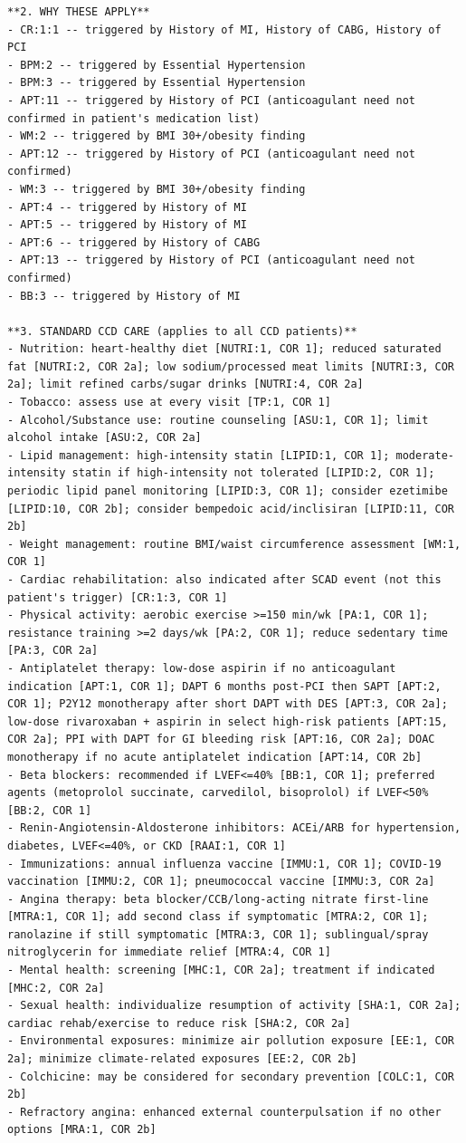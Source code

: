 \begin{lstlisting}
**2. WHY THESE APPLY**
- CR:1:1 -- triggered by History of MI, History of CABG, History of PCI
- BPM:2 -- triggered by Essential Hypertension
- BPM:3 -- triggered by Essential Hypertension
- APT:11 -- triggered by History of PCI (anticoagulant need not confirmed in patient's medication list)
- WM:2 -- triggered by BMI 30+/obesity finding
- APT:12 -- triggered by History of PCI (anticoagulant need not confirmed)
- WM:3 -- triggered by BMI 30+/obesity finding
- APT:4 -- triggered by History of MI
- APT:5 -- triggered by History of MI
- APT:6 -- triggered by History of CABG
- APT:13 -- triggered by History of PCI (anticoagulant need not confirmed)
- BB:3 -- triggered by History of MI

**3. STANDARD CCD CARE (applies to all CCD patients)**
- Nutrition: heart-healthy diet [NUTRI:1, COR 1]; reduced saturated fat [NUTRI:2, COR 2a]; low sodium/processed meat limits [NUTRI:3, COR 2a]; limit refined carbs/sugar drinks [NUTRI:4, COR 2a]
- Tobacco: assess use at every visit [TP:1, COR 1]
- Alcohol/Substance use: routine counseling [ASU:1, COR 1]; limit alcohol intake [ASU:2, COR 2a]
- Lipid management: high-intensity statin [LIPID:1, COR 1]; moderate-intensity statin if high-intensity not tolerated [LIPID:2, COR 1]; periodic lipid panel monitoring [LIPID:3, COR 1]; consider ezetimibe [LIPID:10, COR 2b]; consider bempedoic acid/inclisiran [LIPID:11, COR 2b]
- Weight management: routine BMI/waist circumference assessment [WM:1, COR 1]
- Cardiac rehabilitation: also indicated after SCAD event (not this patient's trigger) [CR:1:3, COR 1]
- Physical activity: aerobic exercise >=150 min/wk [PA:1, COR 1]; resistance training >=2 days/wk [PA:2, COR 1]; reduce sedentary time [PA:3, COR 2a]
- Antiplatelet therapy: low-dose aspirin if no anticoagulant indication [APT:1, COR 1]; DAPT 6 months post-PCI then SAPT [APT:2, COR 1]; P2Y12 monotherapy after short DAPT with DES [APT:3, COR 2a]; low-dose rivaroxaban + aspirin in select high-risk patients [APT:15, COR 2a]; PPI with DAPT for GI bleeding risk [APT:16, COR 2a]; DOAC monotherapy if no acute antiplatelet indication [APT:14, COR 2b]
- Beta blockers: recommended if LVEF<=40% [BB:1, COR 1]; preferred agents (metoprolol succinate, carvedilol, bisoprolol) if LVEF<50% [BB:2, COR 1]
- Renin-Angiotensin-Aldosterone inhibitors: ACEi/ARB for hypertension, diabetes, LVEF<=40%, or CKD [RAAI:1, COR 1]
- Immunizations: annual influenza vaccine [IMMU:1, COR 1]; COVID-19 vaccination [IMMU:2, COR 1]; pneumococcal vaccine [IMMU:3, COR 2a]
- Angina therapy: beta blocker/CCB/long-acting nitrate first-line [MTRA:1, COR 1]; add second class if symptomatic [MTRA:2, COR 1]; ranolazine if still symptomatic [MTRA:3, COR 1]; sublingual/spray nitroglycerin for immediate relief [MTRA:4, COR 1]
- Mental health: screening [MHC:1, COR 2a]; treatment if indicated [MHC:2, COR 2a]
- Sexual health: individualize resumption of activity [SHA:1, COR 2a]; cardiac rehab/exercise to reduce risk [SHA:2, COR 2a]
- Environmental exposures: minimize air pollution exposure [EE:1, COR 2a]; minimize climate-related exposures [EE:2, COR 2b]
- Colchicine: may be considered for secondary prevention [COLC:1, COR 2b]
- Refractory angina: enhanced external counterpulsation if no other options [MRA:1, COR 2b]


\end{lstlisting}
